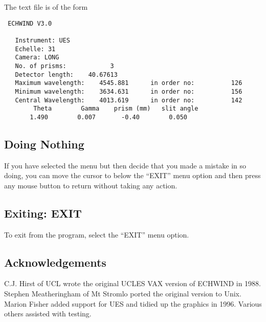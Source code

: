 \documentclass[11pt]{article}
\begin{document}
The text file is of the form
\begin{verbatim}
 ECHWIND V3.0
  
   Instrument: UES                 
   Echelle: 31                  
   Camera: LONG                
   No. of prisms:            3
   Detector length:    40.67613    
   Maximum wavelength:    4545.881      in order no:          126
   Minimum wavelength:    3634.631      in order no:          156
   Central Wavelength:    4013.619      in order no:          142
        Theta        Gamma    prism (mm)   slit angle
       1.490        0.007       -0.40        0.050
\end{verbatim}

\subsection{Doing Nothing}

If you have selected the menu but then decide that you made a mistake in so
doing, you can move the cursor to below the ``EXIT'' menu option and then
press any mouse button to return without taking any action.

\subsection{Exiting: EXIT}

To exit from the program, select the ``EXIT'' menu option.

\subsection{Acknowledgements}

C.J. Hirst of UCL wrote the original UCLES VAX version of ECHWIND in 1988.
Stephen Meatheringham of Mt Stromlo ported the original version to Unix.
Marion Fisher added support for UES and tidied up the graphics in 1996.
Various others assisted with testing.
\end{document}
